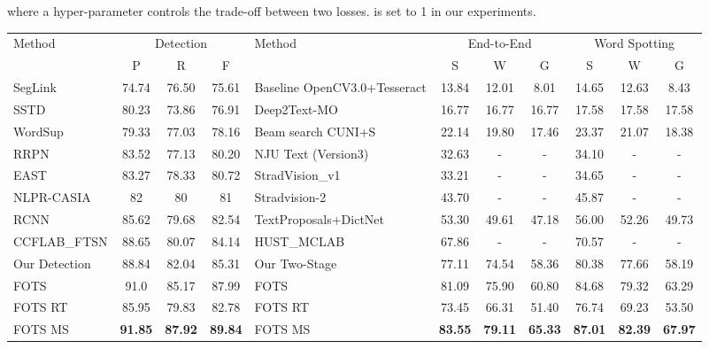 \documentclass[10pt,twocolumn,letterpaper]{article}
\begin{document}
where a hyper-parameter  controls the trade-off between two losses.  is set to 1 in our experiments.
\begin{table*}
\small
\begin{center}
\setlength{\tabcolsep}{5pt}
\begin{tabular}{l|ccc|l|ccc|ccc}
\hline
\multirow{2}{*}{Method} & \multicolumn{3}{c|}{Detection} & \multirow{2}{*}{Method} & \multicolumn{3}{c|}{End-to-End} & \multicolumn{3}{c}{Word Spotting}\\ \cline{2-4} \cline{6-11}
 & P & R & F & & S & W & G & S & W & G \\ \hline
SegLink \cite{shi2017seglink} & 74.74 & 76.50 & 75.61 & Baseline OpenCV3.0+Tesseract \cite{karatzas2015icdar15} & 13.84 & 12.01 & 8.01 & 14.65 & 12.63 & 8.43 \\
SSTD \cite{he2017sstd} & 80.23 & 73.86 & 76.91 & Deep2Text-MO \cite{yin2014robust,yin2015multi,jaderberg2016ijcv} & 16.77 & 16.77 & 16.77 & 17.58 & 17.58 & 17.58\\
WordSup \cite{hu2017wordsup} & 79.33 & 77.03& 78.16 & Beam search CUNI+S \cite{karatzas2015icdar15} & 22.14 & 19.80 & 17.46 & 23.37 & 21.07 & 18.38\\
RRPN \cite{ma2017rcnn} & 83.52 & 77.13 & 80.20 & NJU Text (Version3) \cite{karatzas2015icdar15} & 32.63 & - & - & 34.10 & - & - \\
EAST \cite{zhou2017east} & 83.27 & 78.33 & 80.72 & StradVision\_v1 \cite{karatzas2015icdar15} & 33.21 & - & - & 34.65 & - & - \\
NLPR-CASIA \cite{he2017casia} & 82 & 80 & 81 & Stradvision-2 \cite{karatzas2015icdar15} & 43.70 & - & - & 45.87 & - & - \\
RCNN \cite{jiang2017r2cnn} & 85.62 &79.68 & 82.54 & TextProposals+DictNet \cite{gomez2017textproposals,jaderberg2014synthetic} & 53.30 & 49.61 & 47.18 & 56.00 & 52.26 & 49.73 \\
CCFLAB\_FTSN \cite{dai2017fused} & 88.65 &80.07 &84.14 & HUST\_MCLAB \cite{shi2017seglink,shi2016crnn} & 67.86 & - & - & 70.57 & - & - \\ \hline
Our Detection & 88.84 & 82.04& 85.31 & Our Two-Stage & 77.11 & 74.54 &58.36 &80.38 &77.66 & 58.19\\
FOTS & 91.0 &	85.17 &	87.99 & FOTS & 81.09 & 75.90 & 60.80 & 84.68 & 79.32 & 63.29 \\
FOTS RT & 85.95 & 79.83&	82.78 & FOTS RT & 73.45 & 66.31 & 51.40 &76.74 &69.23 &53.50 \\
FOTS MS &\textbf{91.85}&\textbf{87.92}&\textbf{89.84}& FOTS MS &\textbf{83.55}&\textbf{79.11}&\textbf{65.33}&\textbf{87.01}&\textbf{82.39}&\textbf{67.97} \\ \hline

\end{tabular}
\end{center}
\end{table*}
\end{document}
